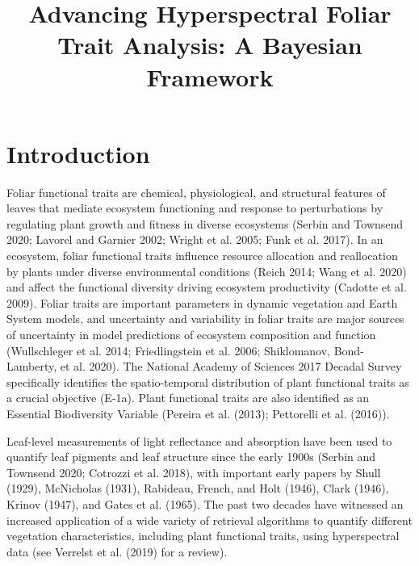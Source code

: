 \documentclass[
  letterpaper,
  DIV=11,
  numbers=noendperiod]{scrartcl}
\title{Advancing Hyperspectral Foliar Trait Analysis: A Bayesian
Framework}
\author{}
\date{}
\begin{document}
\maketitle
\ifdefined\Shaded\renewenvironment{Shaded}{\begin{tcolorbox}[interior hidden, breakable, sharp corners, borderline west={3pt}{0pt}{shadecolor}, enhanced, boxrule=0pt, frame hidden]}{\end{tcolorbox}}\fi

\hypertarget{introduction}{%
\section{Introduction}\label{introduction}}

Foliar functional traits are chemical, physiological, and structural
features of leaves that mediate ecosystem functioning and response to
perturbations by regulating plant growth and fitness in diverse
ecosystems (Serbin and Townsend 2020; Lavorel and Garnier 2002; Wright
et al. 2005; Funk et al. 2017). In an ecosystem, foliar functional
traits influence resource allocation and reallocation by plants under
diverse environmental conditions (Reich 2014; Wang et al. 2020) and
affect the functional diversity driving ecosystem productivity (Cadotte
et al. 2009). Foliar traits are important parameters in dynamic
vegetation and Earth System models, and uncertainty and variability in
foliar traits are major sources of uncertainty in model predictions of
ecosystem composition and function (Wullschleger et al. 2014;
Friedlingstein et al. 2006; Shiklomanov, Bond-Lamberty, et al. 2020).
The National Academy of Sciences 2017 Decadal Survey specifically
identifies the spatio-temporal distribution of plant functional traits
as a crucial objective (E-1a). Plant functional traits are also
identified as an Essential Biodiversity Variable (Pereira et al. (2013);
Pettorelli et al. (2016)).

Leaf-level measurements of light reflectance and absorption have been
used to quantify leaf pigments and leaf structure since the early 1900s
(Serbin and Townsend 2020; Cotrozzi et al. 2018), with important early
papers by Shull (1929), McNicholas (1931), Rabideau, French, and Holt
(1946), Clark (1946), Krinov (1947), and Gates et al. (1965). The past
two decades have witnessed an increased application of a wide variety of
retrieval algorithms to quantify different vegetation characteristics,
including plant functional traits, using hyperspectral data (see
Verrelst et al. (2019) for a review).
\end{document}
